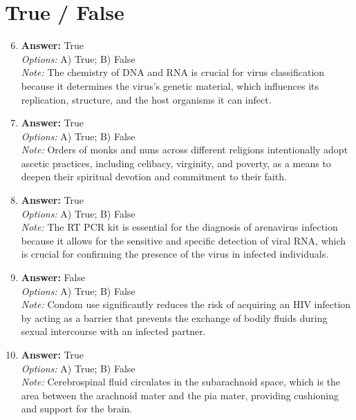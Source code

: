 \documentclass[12pt]{article}
\begin{document}
\section*{True / False}
\begin{enumerate}[label=\arabic*.]
\setcounter{enumi}{5}
\item \textbf{Answer:} True
\\ \textit{Options:} A) True; B) False
\\ \textit{Note:} The chemistry of DNA and RNA is crucial for virus classification because it determines the virus's genetic material, which influences its replication, structure, and the host organisms it can infect.
\item \textbf{Answer:} True
\\ \textit{Options:} A) True; B) False
\\ \textit{Note:} Orders of monks and nuns across different religions intentionally adopt ascetic practices, including celibacy, virginity, and poverty, as a means to deepen their spiritual devotion and commitment to their faith.
\item \textbf{Answer:} True
\\ \textit{Options:} A) True; B) False
\\ \textit{Note:} The RT PCR kit is essential for the diagnosis of arenavirus infection because it allows for the sensitive and specific detection of viral RNA, which is crucial for confirming the presence of the virus in infected individuals.
\item \textbf{Answer:} False
\\ \textit{Options:} A) True; B) False
\\ \textit{Note:} Condom use significantly reduces the risk of acquiring an HIV infection by acting as a barrier that prevents the exchange of bodily fluids during sexual intercourse with an infected partner.
\item \textbf{Answer:} True
\\ \textit{Options:} A) True; B) False
\\ \textit{Note:} Cerebrospinal fluid circulates in the subarachnoid space, which is the area between the arachnoid mater and the pia mater, providing cushioning and support for the brain.
\end{enumerate}
\end{document}
